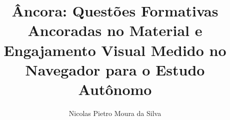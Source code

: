 \documentclass[portuguese,oneside]{tcc}
\author{Nicolas Pietro Moura da Silva}
\title{Âncora: Questões Formativas Ancoradas no Material e Engajamento Visual Medido no Navegador para o Estudo Autônomo}
      {Âncora: Material-Grounded Formative Questions and In-Browser Visual Engagement Measurement for Self-Directed Study}
\begin{document}


\listoffigures
\listoftables
\listofacronyms
\tableofcontents












\appendix

\end{document}
